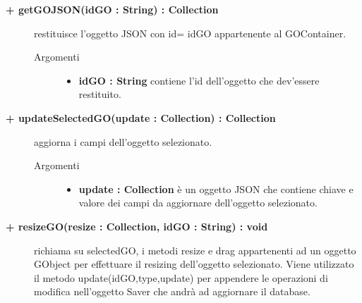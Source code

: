 \begin{description}
\begin{description}
\begin{description}
\end{description}

\end{description}


\begin{description}
		\item[\textbf{\color{blue}+ getGOJSON(idGO : String) : Collection			}] \hfill
			restituisce l'oggetto JSON con id= idGO appartenente al GOContainer.   

\begin{description}
			\item[Argomenti] \hfill
				\begin{itemize}
						\item \textbf{idGO : String			} \hfill
					contiene l'id dell'oggetto che dev'essere restituito.
				\end{itemize}

\end{description}

\end{description}

\begin{description}
		\item[\textbf{\color{blue}+ updateSelectedGO(update : Collection) : Collection			}] \hfill
			aggiorna i campi dell'oggetto selezionato.   

\begin{description}
			\item[Argomenti] \hfill
				\begin{itemize}
						\item \textbf{update : Collection			} \hfill
					è un oggetto JSON che contiene chiave e valore dei campi da aggiornare dell'oggetto selezionato.
				\end{itemize}

\end{description}

\end{description}

\begin{description}
		\item[\textbf{\color{blue}+ resizeGO(resize : Collection, idGO : String) : void			}] \hfill
			richiama su selectedGO, i metodi resize e drag appartenenti ad un oggetto GObject per effettuare il resizing dell'oggetto selezionato. Viene utilizzato il metodo update(idGO,type,update) per appendere le operazioni di modifica nell'oggetto Saver che andrà ad aggiornare il database. 


\end{description}
\end{description}
